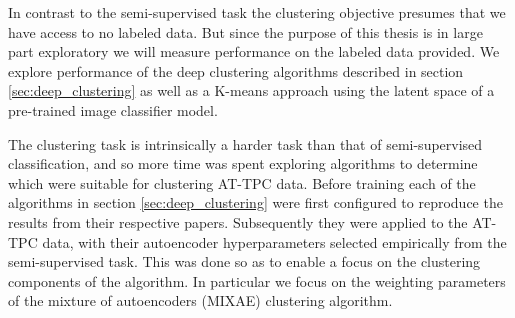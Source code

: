 In contrast to the semi-supervised task the clustering objective presumes that we have access to no labeled data. But since the purpose of this thesis is in large part exploratory we will measure performance on the labeled data provided. We explore performance of the deep clustering algorithms described in section \ref{sec:deep_clustering} as well as a K-means approach using the latent space of a pre-trained image classifier model. 

The clustering task is intrinsically a harder task than that of semi-supervised classification, and so more time was spent exploring algorithms to determine which were suitable for clustering AT-TPC data. Before training each of the algorithms in section \ref{sec:deep_clustering} were first configured to reproduce the results from their respective papers. Subsequently they were applied to the AT-TPC data, with their autoencoder hyperparameters selected empirically from the semi-supervised task. This was done so as to enable a focus on the clustering components of the algorithm. In particular we focus on the weighting parameters of the mixture of autoencoders (MIXAE) clustering algorithm.
